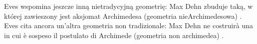 Eves wspomina jeszcze inną nietradycyjną geometrię: Max Dehn zbuduje taką, w której zawieszony jest aksjomat Archimedesa (geometria nieArchimedesowa) \cite[s. 288]{eves1_1972}. %
Eves cita ancora un'altra geometria non tradizionale: Max Dehn ne costruirà una in cui è sospeso il postulato di Archimede (geometria non archimedea) \cite[p. 288]{eves1_1972}. %
%


